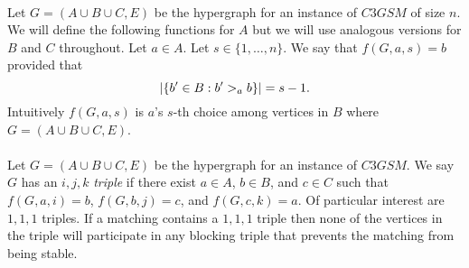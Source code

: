 \paragraph{}Let $G=(A\cup B \cup C, E)$ be the hypergraph for an instance of $C3GSM$ of size $n$. We will define the following functions for $A$ but we will use analogous versions for $B$ and $C$ throughout. Let $a \in A$. Let $s \in \{1,\dots,n\}$. We say that $f(G,a,s) = b$ provided that
$$\left|\{b'\in B : b' >_a b\}\right| = s-1.$$  Intuitively $f(G,a,s)$ is $a$'s $s$-th choice among vertices in $B$ where $G = (A\cup B \cup C, E)$.

\paragraph{}Let $G = (A \cup B \cup C, E)$ be the hypergraph for an instance of $C3GSM$. We say $G$ has an $i,j,k$ {\it triple} if there exist $a \in A$, $b\in B$, and $c \in C$ such that $f(G,a,i) = b$, $f(G,b,j) = c$, and $f(G,c,k) = a$. Of particular interest are $1,1,1$ triples. If a matching contains a $1,1,1$ triple then none of the vertices in the triple will participate in any blocking triple that prevents the matching from being stable.

